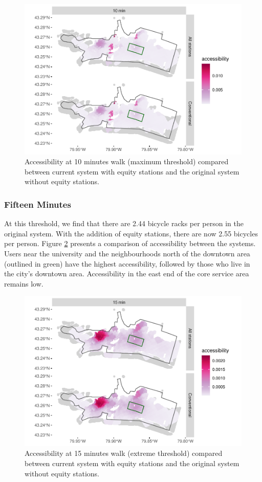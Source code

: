 \documentclass[]{elsarticle} %
\begin{document}
\begin{figure}

{\centering \includegraphics[width=0.65\linewidth]{Bike-share-spatial-equity_files/figure-latex/figure-8-1} 

}

\caption{Accessibility at 10 minutes walk (maximum threshold) compared between current system with equity stations and the original system without equity stations.}\label{fig:figure-8}
\end{figure}

\hypertarget{fifteen-minutes}{%
\subsubsection{Fifteen Minutes}\label{fifteen-minutes}}

At this threshold, we find that there are 2.44 bicycle racks per person
in the original system. With the addition of equity stations, there are
now 2.55 bicycles per person. Figure \ref{fig:figure-9} presents a
comparison of accessibility between the systems. Users near the
university and the neighbourhoods north of the downtown area (outlined
in green) have the highest accessibility, followed by those who live in
the city's downtown area. Accessibility in the east end of the core
service area remains low.

\begin{figure}

{\centering \includegraphics[width=0.65\linewidth]{Bike-share-spatial-equity_files/figure-latex/figure-9-1} 

}

\caption{Accessibility at 15 minutes walk (extreme threshold) compared between current system with equity stations and the original system without equity stations.}\label{fig:figure-9}
\end{figure}
\end{document}

